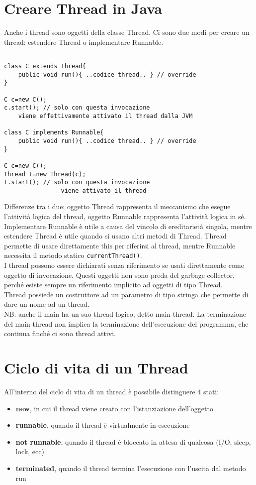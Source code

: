 \section{Creare Thread in Java}
Anche i thread sono oggetti della classe Thread. Ci sono due modi per creare un thread: estendere Thread o implementare Runnable.
\begin{lstlisting}

class C extends Thread{
    public void run(){ ..codice thread.. } // override
}

C c=new C();
c.start(); // solo con questa invocazione 
	viene effettivamente attivato il thread dalla JVM
	
class C implements Runnable{
    public void run(){ ..codice thread.. } // override
}

C c=new C();
Thread t=new Thread(c);
t.start(); // solo con questa invocazione
				viene attivato il thread 

\end{lstlisting}
Differenze tra i due: oggetto Thread rappresenta il meccanismo che esegue l'attività logica del thread, oggetto Runnable rappresenta l'attività logica in sé.
Implementare Runnable è utile a causa del vincolo di ereditarietà singola, mentre estendere Thread è utile quando si usano altri metodi di Thread.
Thread permette di usare direttamente this per riferirsi al thread, mentre Runnable necessita il metodo statico \texttt{currentThread()}. \\
I thread possono essere dichiarati senza riferimento se usati direttamente come oggetto di invocazione. Questi oggetti non sono preda del garbage collector, perché esiste sempre un riferimento implicito ad oggetti di tipo Thread. \\
Thread possiede un costruttore ad un parametro di tipo stringa che permette di dare un nome ad un thread. \\
NB: anche il main ha un suo thread logico, detto main thread. La terminazione del main thread non implica la terminazione dell'esecuzione del programma, che continua finché ci sono thread attivi.


\section{Ciclo di vita di un Thread}
All'interno del ciclo di vita di un thread è possibile distinguere 4 stati:
\begin{itemize}
\item \textbf{new}, in cui il thread viene creato con l'istanziazione dell'oggetto
\item \textbf{runnable}, quando il thread è virtualmente in esecuzione
\item \textbf{not runnable}, quando il thread è bloccato in attesa di qualcosa (I/O, sleep, lock, ecc)
\item \textbf{terminated}, quando il thread termina l'esecuzione con l'uscita dal metodo run
\end{itemize}

